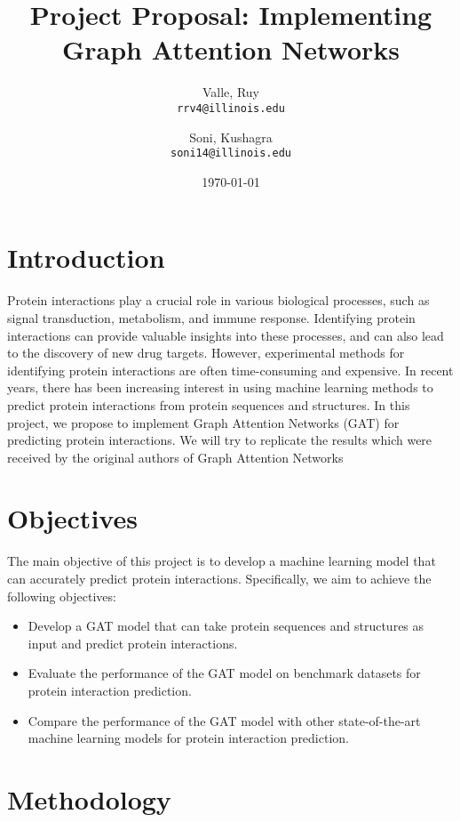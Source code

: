 \documentclass{article}
\title{Project Proposal: Implementing Graph Attention Networks}
\author{Valle, Ruy\\
\texttt{rrv4@illinois.edu}
\and
Soni, Kushagra\\
\texttt{soni14@illinois.edu}
}
\date{\today}
\begin{document}
    \maketitle

    \onehalfspacing


    \section{Introduction}\label{sec:introduction}

    Protein interactions play a crucial role in various biological processes, such as signal transduction,
    metabolism, and immune response.
    Identifying protein interactions can provide valuable insights into these processes, and can also lead to the discovery of new drug targets.
    However, experimental methods for identifying protein interactions are often time-consuming and expensive.
    In recent years, there has been increasing interest in using machine learning methods to predict protein interactions from protein sequences and structures.
    In this project, we propose to implement Graph Attention Networks (GAT) for predicting protein interactions.
    We will try to replicate the results which were received by the original authors of Graph Attention Networks \cite{velickovic2018graph}


    \section{Objectives}\label{sec:objectives}

    The main objective of this project is to develop a machine learning model that can accurately predict protein interactions.
    Specifically, we aim to achieve the following objectives:

    \begin{itemize}
        \item Develop a GAT model that can take protein sequences and structures as input and predict protein interactions.
        \item Evaluate the performance of the GAT model on benchmark datasets for protein interaction prediction.
        \item Compare the performance of the GAT model with other state-of-the-art machine learning models for protein interaction prediction.
    \end{itemize}


    \section{Methodology}\label{sec:methodology}
\end{document}
